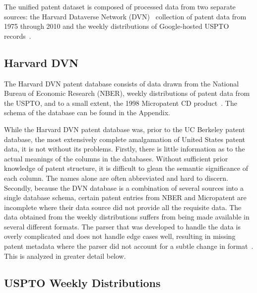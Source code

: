 The unified patent dataset is composed of processed data from two
separate sources: the Harvard Dataverse Network (DVN)~\cite{disambiguation}
collection of patent data from 1975 through 2010 and the weekly distributions
of Google-hosted USPTO records~\cite{googlefiles}\cite{googlefiles-applications}.


\subsection{Harvard DVN}

The Harvard DVN patent database consists of data drawn from the National
Bureau of Economic Research (NBER), weekly distributions of patent
data from the USPTO, and to a small extent, the 1998 Micropatent CD
product~\cite{micropatent}. The schema of the database can be found
in the Appendix.

While the Harvard DVN patent database was, prior to the UC Berkeley
patent database, the most extensively complete amalgamation of United
States patent data, it is not without its problems. Firstly, there
is little information as to the actual meanings of the columns in
the databases. Without sufficient prior knowledge of patent structure,
it is difficult to glean the semantic significance of each column.
The names alone are often abbreviated and hard to discern. Secondly,
because the DVN database is a combination of several sources into
a single database schema, certain patent entries from NBER and Micropatent
are incomplete where their data source did not provide all the requisite
data. The data obtained from the weekly distributions suffers from
being made available in several different formats. The parser that
was developed to handle the data is overly complicated and does not
handle edge cases well, resulting in missing patent metadata where
the parser did not account for a subtle change in format~\cite{oldparser}.
This is analyzed in greater detail below.


\subsection{USPTO Weekly Distributions}

